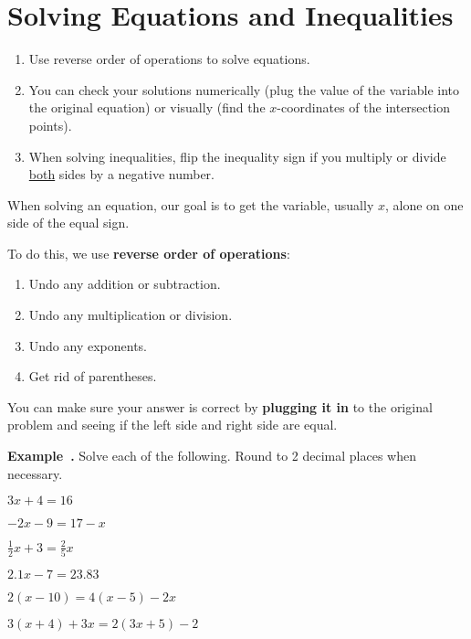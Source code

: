 \documentclass{article}
\newcounter{example}[section]
\newenvironment{example}[1][]{\refstepcounter{example}\par\medskip
   {\color{red}\textbf{Example~\theexample. #1}}}{\medskip}
\begin{document}
\section*{Solving Equations and Inequalities}

\begin{tcolorbox}[colframe=orange!70!white, coltitle=black, title=\textbf{Summary}]
\begin{enumerate}
    \item Use reverse order of operations to solve equations.
    \item You can check your solutions numerically (plug the value of the variable into the original equation) or visually (find the $x$-coordinates of the intersection points).
    \item When solving inequalities, flip the inequality sign if you multiply or divide \underline{both} sides by a negative number.
\end{enumerate}
\end{tcolorbox}
\bigskip 

When solving an equation, our goal is to get the variable, usually $x$, alone on one side of the equal sign.	
\bigskip 

To do this, we use \textbf{reverse order of operations}:	
\begin{enumerate}
	\item Undo any addition or subtraction. 
	\item Undo any multiplication or division.
	\item Undo any exponents.
	\item Get rid of parentheses.
\end{enumerate}
\bigskip 

You can make sure your answer is correct by {\color{blue}\textbf{plugging it in}} to the original problem and seeing if the left side and right side are equal. 
\bigskip 

\begin{example}
Solve each of the following. Round to 2 decimal places when necessary.
\begin{enumerate}[(a)]
\begin{multicols}{3}
    \item $3x + 4 = 16$
    \item $-2x-9=17-x$
    \item $\frac{1}{2}x + 3 = \frac{2}{5}x$
\end{multicols}
\vfill 
\begin{multicols}{3}
    \item $2.1x - 7 = 23.83$
    \item $2(x-10) = 4(x-5)-2x$
    \item $3(x+4)+3x = 2(3x+5)-2$
\end{multicols}
\end{enumerate}
\vfill 
\end{example}
\end{document}
